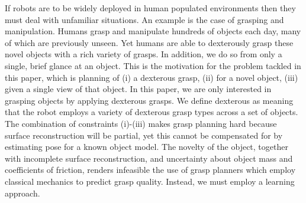 \noindent
If robots are to be widely deployed in human populated environments then they must deal with unfamiliar situations. An example is the case of grasping and manipulation. Humans grasp and manipulate hundreds of objects each day, many of which are previously unseen. Yet humans are able to dexterously grasp these novel objects with a rich variety of grasps. In addition, we do so from only a single, brief glance at an object. This is the motivation for the problem tackled in this paper, which is planning of (i) a dexterous grasp, (ii) for a novel object, (iii) given a single view of that object. In this paper, we are only interested in grasping objects by applying dexterous grasps. We define dexterous as meaning that the robot employs a variety of dexterous grasp types across a set of objects. The combination of constraints (i)-(iii) makes grasp planning hard because surface reconstruction will be partial, yet this cannot be compensated for by estimating pose for a known object model. The novelty of the object, together with incomplete surface reconstruction, and uncertainty about object mass and coefficients of friction, renders infeasible the use of grasp planners which employ classical mechanics to predict grasp quality. Instead, we must employ a learning approach.

